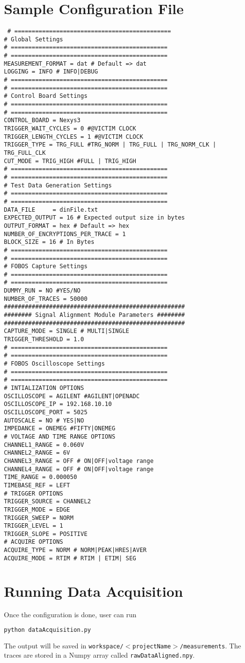 \section{Sample Configuration File}

\begin{verbatim}
 # ============================================= 
# Global Settings 
# ============================================= 
# ============================================= 
MEASUREMENT_FORMAT = dat # Default => dat 
LOGGING = INFO # INFO|DEBUG 
# ============================================= 
# ============================================= 
# Control Board Settings 
# ============================================= 
# ============================================= 
CONTROL_BOARD = Nexys3 
TRIGGER_WAIT_CYCLES = 0 #@VICTIM CLOCK 
TRIGGER_LENGTH_CYCLES = 1 #@VICTIM CLOCK 
TRIGGER_TYPE = TRG_FULL #TRG_NORM | TRG_FULL | TRG_NORM_CLK | TRG_FULL_CLK 
CUT_MODE = TRIG_HIGH #FULL | TRIG_HIGH 
# ============================================= 
# ============================================= 
# Test Data Generation Settings 
# ============================================= 
# ============================================= 
DATA_FILE     = dinFile.txt 
EXPECTED_OUTPUT = 16 # Expected output size in bytes 
OUTPUT_FORMAT = hex # Default => hex 
NUMBER_OF_ENCRYPTIONS_PER_TRACE = 1 
BLOCK_SIZE = 16 # In Bytes 
# ============================================= 
# ============================================= 
# FOBOS Capture Settings 
# ============================================= 
# ============================================= 
DUMMY_RUN = NO #YES/NO 
NUMBER_OF_TRACES = 50000 
#################################################### 
######## Signal Alignment Module Parameters ######## 
#################################################### 
CAPTURE_MODE = SINGLE # MULTI|SINGLE 
TRIGGER_THRESHOLD = 1.0 
# ============================================= 
# ============================================= 
# FOBOS Oscilloscope Settings 
# ============================================= 
# ============================================= 
# INTIALIZATION OPTIONS 
OSCILLOSCOPE = AGILENT #AGILENT|OPENADC 
OSCILLOSCOPE_IP = 192.168.10.10 
OSCILLOSCOPE_PORT = 5025 
AUTOSCALE = NO # YES|NO
IMPEDANCE = ONEMEG #FIFTY|ONEMEG 
# VOLTAGE AND TIME RANGE OPTIONS
CHANNEL1_RANGE = 0.060V 
CHANNEL2_RANGE = 6V 
CHANNEL3_RANGE = OFF # ON|OFF|voltage range 
CHANNEL4_RANGE = OFF # ON|OFF|voltage range 
TIME_RANGE = 0.000050 
TIMEBASE_REF = LEFT
# TRIGGER OPTIONS 
TRIGGER_SOURCE = CHANNEL2 
TRIGGER_MODE = EDGE
TRIGGER_SWEEP = NORM 
TRIGGER_LEVEL = 1 
TRIGGER_SLOPE = POSITIVE 
# ACQUIRE OPTIONS 
ACQUIRE_TYPE = NORM # NORM|PEAK|HRES|AVER 
ACQUIRE_MODE = RTIM # RTIM | ETIM| SEG
\end{verbatim}

\section{Running Data Acquisition}
Once the configuration is done, user can run 

\texttt{python dataAcquisition.py }

The output will be saved in \texttt{workspace/$<$projectName$>$/measurements}. The traces are stored in a Numpy array called \texttt{rawDataAligned.npy}.




